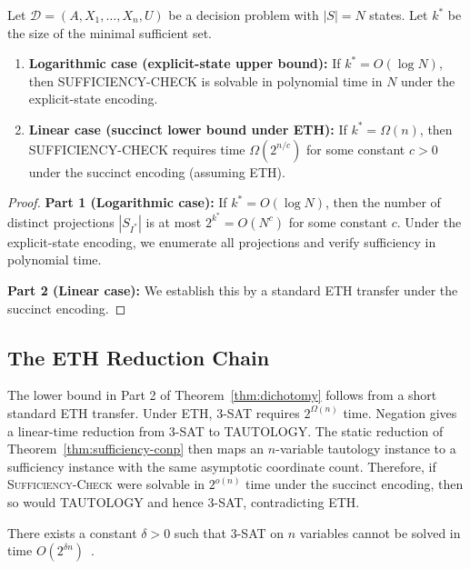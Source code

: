 \begin{theorem}\label{thm:dichotomy}
Let $\mathcal{D} = (A, X_1, \ldots, X_n, U)$ be a decision problem with $|S| = N$ states. Let $k^*$ be the size of the minimal sufficient set.

\begin{enumerate}
\item \textbf{Logarithmic case (explicit-state upper bound):} If $k^* = O(\log N)$, then SUFFICIENCY-CHECK is solvable in polynomial time in $N$ under the explicit-state encoding.

\item \textbf{Linear case (succinct lower bound under ETH):} If $k^* = \Omega(n)$, then SUFFICIENCY-CHECK requires time $\Omega(2^{n/c})$ for some constant $c > 0$ under the succinct encoding (assuming ETH).
\end{enumerate}
\end{theorem}


\begin{proof}
\textbf{Part 1 (Logarithmic case):} If $k^* = O(\log N)$, then the number of distinct projections $|S_{I^*}|$ is at most $2^{k^*} = O(N^c)$ for some constant $c$. Under the explicit-state encoding, we enumerate all projections and verify sufficiency in polynomial time.

\textbf{Part 2 (Linear case):} We establish this by a standard ETH transfer under the succinct encoding.
\end{proof}

\subsection{The ETH Reduction Chain}\label{sec:eth-chain}

The lower bound in Part 2 of Theorem~\ref{thm:dichotomy} follows from a short standard ETH transfer. Under ETH, 3-SAT requires $2^{\Omega(n)}$ time. Negation gives a linear-time reduction from 3-SAT to TAUTOLOGY. The static reduction of Theorem~\ref{thm:sufficiency-conp} then maps an $n$-variable tautology instance to a sufficiency instance with the same asymptotic coordinate count. Therefore, if \textsc{Sufficiency-Check} were solvable in $2^{o(n)}$ time under the succinct encoding, then so would TAUTOLOGY and hence 3-SAT, contradicting ETH.

\begin{definition}
There exists a constant $\delta > 0$ such that 3-SAT on $n$ variables cannot be solved in time $O(2^{\delta n})$~\cite{impagliazzo2001complexity}.
\end{definition}

